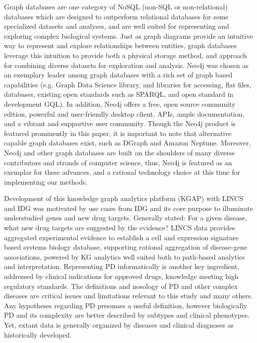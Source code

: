 Graph databases are one category of NoSQL (non-SQL or non-relational) databases which are designed to outperform relational databases for some specialized datasets and analyses, and are well suited for representing and exploring complex biological systems\cite{Himmelstein2015-ie,Have2013-hx,Yoon2017-jv}. Just as graph diagrams provide an intuitive way to represent and explore relationships between entities, graph databases leverage this intuition to provide both a physical storage method, and approach for combining diverse datasets for exploration and analysis. Neo4j was chosen as an exemplary leader among graph databases with a rich set of graph based capabilities (e.g. Graph Data Science library,  and libraries for accessing, flat files, databases, existing open standards such as SPARQL, and open standard in development GQL\cite{JCC_Consulting_Inc_acting_on_behalf_of_an_unincorporated_association_of_ISO_Graph_Query_Language_Proponents_and_licensed_under_the_Apache_License_Version_2_undated-lm}).  In addition, Neo4j offers a free, open source community edition\cite{Neo4j_Inc_undated-hy}, powerful and user-friendly desktop client, APIs, ample documentation, and a vibrant and supportive user community. Though the Neo4j product is featured prominently in this paper, it is important to note that alternative capable graph databases exist, such as DGraph\cite{Dgraph_Labs_Inc_undated-ko} and Amazon Neptune\cite{Amazon_Web_Services_Inc_undated-lu}. Moreover, Neo4j and other graph databases are built on the shoulders of many diverse contributors and strands of computer science, thus, Neo4j is featured as an exemplar for these advances, and a rational technology choice at this time for implementing our methods.

Development of this knowledge graph analytics platform (KGAP) with LINCS and IDG was motivated by use cases from IDG and its core purpose to illuminate understudied genes and new drug targets. Generally stated: For a given disease, what new drug targets are suggested by the evidence? LINCS data provides aggregated experimental evidence to establish a cell and expression signature based systems biology database, supporting rational aggregation of disease-gene associations, powered by KG analytics well suited both to path-based analytics and interpretation. Representing PD informatically is another key ingredient, addressed by clinical indications for approved drugs, knowledge meeting high regulatory standards. The definitions and nosology of PD and other complex diseases are critical issues and limitations relevant to this study and many others. Any hypotheses regarding PD presumes a useful definition, however biologically PD and its complexity are better described by subtypes and clinical phenotypes. Yet, extant data is generally organized by diseases and clinical diagnoses as historically developed.

